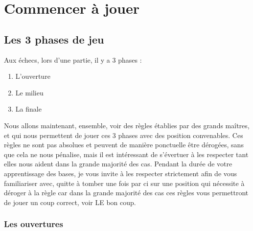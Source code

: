 \documentclass[a5paper,openany,twocolumn]{book}
\begin{document}
{\newpage \thispagestyle{empty}
\strut
\newpage \thispagestyle{empty}

\twocolumn

\part{Commencer à jouer}

\onecolumn

\newpage \thispagestyle{empty}
\strut
\newpage \thispagestyle{empty}

\twocolumn

\setcounter{chapter}{0}

\chapter{Les 3 phases de jeu}

Aux échecs, lors d'une partie, il y a 3 phases :

\begin{enumerate}

\item{L'ouverture}

\item{Le milieu}

\item{La finale}

\end{enumerate}

Nous allons maintenant, ensemble, voir des règles établies par des grands maîtres, et qui nous permettent de jouer ces 3 phases avec des position convenables. Ces règles ne sont pas absolues et peuvent de manière ponctuelle être dérogées, sans que cela ne nous pénalise, mais il est intéressant de s’évertuer à les respecter tant elles nous aident dans la grande majorité des cas. Pendant la durée de votre apprentissage des bases, je vous invite à les respecter strictement afin de vous familiariser avec, quitte à tomber une fois par ci sur une position qui nécessite à déroger à la règle car dans la grande majorité des cas ces règles vous permettront de jouer un coup correct, voir LE bon coup.

\section{Les ouvertures}

}
\end{document}

